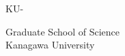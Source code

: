 \renewcommand\thepage{Title1}
\thispagestyle{empty}
 {\raggedleft
 \normalsize KU-\studentnumber \\
 }
 \vspace*{9truemm}
 \begin{center}
  \Large\bfseries\edoctitle
 \end{center}
 \vspace*{27truemm}
 \begin{center}
  \Large\bfseries\etitle
 \end{center}
 \vspace*{18truemm}
 \begin{center}
  \Large\eauthor
 \end{center}
 \vspace*{45truemm}
 \begin{center}
  \edate
 \end{center}
 \vspace*{4truemm}
 \begin{center}
  Graduate School of Science \\
  Kanagawa University
 \end{center}
 \vspace*{\fill}
